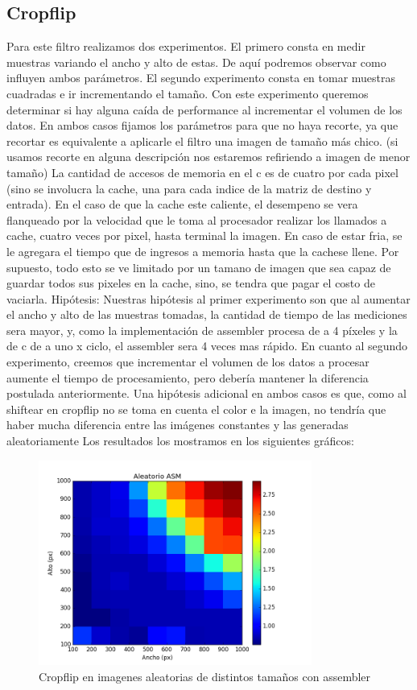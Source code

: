 \subsection{Cropflip}
\hfill \break
Para este filtro realizamos dos experimentos. El primero consta en medir muestras variando el ancho y alto de estas. De aquí podremos observar como influyen ambos parámetros. El segundo experimento consta en tomar muestras cuadradas e ir incrementando el tamaño. Con este experimento queremos determinar si hay alguna caída de performance al incrementar el volumen de los datos. En ambos casos fijamos los parámetros para que no haya recorte, ya que recortar es equivalente a aplicarle el filtro una imagen de tamaño más chico. (si usamos recorte en alguna descripción nos estaremos refiriendo a imagen de menor tamaño)
La cantidad de accesos de memoria en el c es de cuatro por cada pixel (sino se involucra la cache, una para cada indice de la matriz de destino y entrada). En el caso de que la cache este caliente, el desempeno se vera flanqueado por la velocidad que le toma al procesador realizar los llamados a cache, cuatro veces por pixel, hasta terminal la imagen. En caso de estar fria, se le agregara el tiempo que de ingresos a memoria hasta que la cachese llene. Por supuesto, todo esto se ve limitado por un tamano de imagen que sea capaz de guardar todos sus pixeles en la cache, sino, se tendra que pagar el costo de vaciarla. 
\hfill \break
Hipótesis: Nuestras hipótesis al primer experimento son que al aumentar el ancho y alto de las muestras tomadas, la cantidad de tiempo de las mediciones sera mayor, y, como la implementación de assembler procesa de a 4 píxeles y la de c de a uno x ciclo,  el assembler sera 4 veces mas rápido.
En cuanto al segundo experimento, creemos que incrementar el volumen de los datos a procesar aumente el tiempo de procesamiento, pero debería mantener la diferencia postulada anteriormente. 
Una hipótesis adicional en ambos casos es que, como al shiftear en cropflip no se toma en cuenta el color e la imagen, no tendría que haber mucha diferencia entre las imágenes constantes y las generadas aleatoriamente
\hfill \break
 Los resultados los mostramos en los siguientes gráficos:
 
 \begin{figure} [H]
  \centering
  \includegraphics[width=0.8\textwidth]{recursos/aleatoriocropflipasm.png}
    \caption{ Cropflip en imagenes aleatorias de distintos tamaños con assembler }
\end{figure}
 
